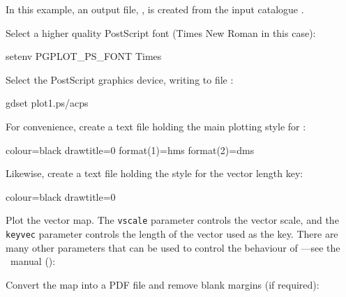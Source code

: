 In this example, an output file, , is created from the input
catalogue .

Select a higher quality PostScript font (Times New Roman in this case):

\begin{terminalv}
setenv PGPLOT_PS_FONT Times
\end{terminalv}

Select the PostScript graphics device, writing to file :

\begin{terminalv}
gdset plot1.ps/acps
\end{terminalv}

For convenience, create a text file holding the main plotting style for
:

\begin{terminalv}
colour=black
drawtitle=0
format(1)=hms
format(2)=dms
\end{terminalv}

Likewise, create a text file holding the style for the vector length
key:

\begin{terminalv}
colour=black
drawtitle=0
\end{terminalv}


Plot the vector map. The \texttt{vscale} parameter controls the vector
scale, and the \texttt{keyvec} parameter controls the length of the
vector used as the key. There are many other parameters that can be
used to control the behaviour of ---see the \polpack\
manual ():

\begin{terminalv}
\end{terminalv}

Convert the map into a PDF file and remove blank margins (if required):

\begin{terminalv}
\end{terminalv}


